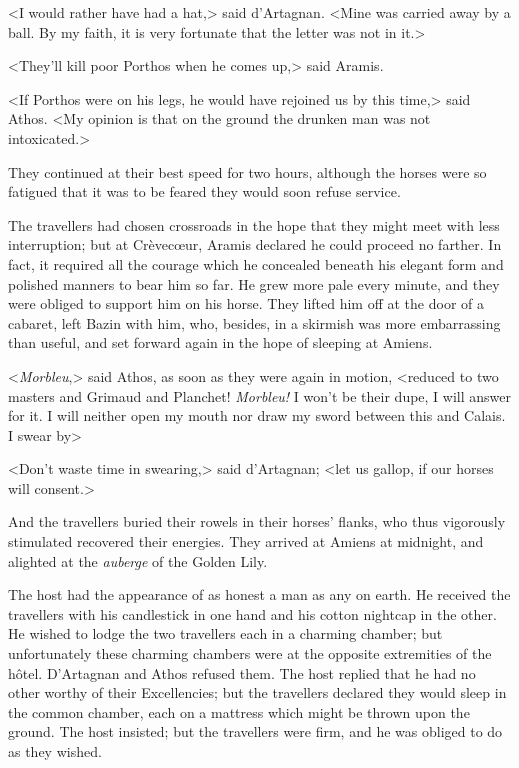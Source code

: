 <I would rather have had a hat,> said d'Artagnan. <Mine was carried away by a ball. By my faith, it is very fortunate that the letter was not in it.> 

<They'll kill poor Porthos when he comes up,> said Aramis. 

<If Porthos were on his legs, he would have rejoined us by this time,> said Athos. <My opinion is that on the ground the drunken man was not intoxicated.> 

They continued at their best speed for two hours, although the horses were so fatigued that it was to be feared they would soon refuse service. 

The travellers had chosen crossroads in the hope that they might meet with less interruption; but at Crèvecœur, Aramis declared he could proceed no farther. In fact, it required all the courage which he concealed beneath his elegant form and polished manners to bear him so far. He grew more pale every minute, and they were obliged to support him on his horse. They lifted him off at the door of a cabaret, left Bazin with him, who, besides, in a skirmish was more embarrassing than useful, and set forward again in the hope of sleeping at Amiens. 

<\textit{Morbleu},> said Athos, as soon as they were again in motion, <reduced to two masters and Grimaud and Planchet! \textit{Morbleu!} I won't be their dupe, I will answer for it. I will neither open my mouth nor draw my sword between this and Calais. I swear by\longdash> 

<Don't waste time in swearing,> said d'Artagnan; <let us gallop, if our horses will consent.> 

And the travellers buried their rowels in their horses' flanks, who thus vigorously stimulated recovered their energies. They arrived at Amiens at midnight, and alighted at the \textit{auberge} of the Golden Lily. 

The host had the appearance of as honest a man as any on earth. He received the travellers with his candlestick in one hand and his cotton nightcap in the other. He wished to lodge the two travellers each in a charming chamber; but unfortunately these charming chambers were at the opposite extremities of the hôtel. D'Artagnan and Athos refused them. The host replied that he had no other worthy of their Excellencies; but the travellers declared they would sleep in the common chamber, each on a mattress which might be thrown upon the ground. The host insisted; but the travellers were firm, and he was obliged to do as they wished. 

